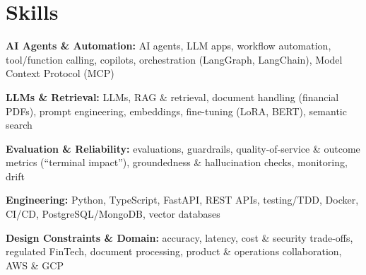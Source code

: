 \documentclass[10pt,a4paper]{article}
\begin{document}
\section{Skills}
\begin{tight}
  \item[\textcolor{accent}{\small$\bullet$}] \textbf{AI Agents \& Automation:} AI agents, LLM apps, workflow automation, tool/function calling, copilots, orchestration (LangGraph, LangChain), Model Context Protocol (MCP)
  \item[\textcolor{accent}{\small$\bullet$}] \textbf{LLMs \& Retrieval:} LLMs, RAG \& retrieval, document handling (financial PDFs), prompt engineering, embeddings, fine-tuning (LoRA, BERT), semantic search
  \item[\textcolor{accent}{\small$\bullet$}] \textbf{Evaluation \& Reliability:} evaluations, guardrails, quality-of-service \& outcome metrics (``terminal impact''), groundedness \& hallucination checks, monitoring, drift
  \item[\textcolor{accent}{\small$\bullet$}] \textbf{Engineering:} Python, TypeScript, FastAPI, REST APIs, testing/TDD, Docker, CI/CD, PostgreSQL/MongoDB, vector databases
  \item[\textcolor{accent}{\small$\bullet$}] \textbf{Design Constraints \& Domain:} accuracy, latency, cost \& security trade-offs, regulated FinTech, document processing, product \& operations collaboration, AWS \& GCP
\end{tight}

\end{document}

